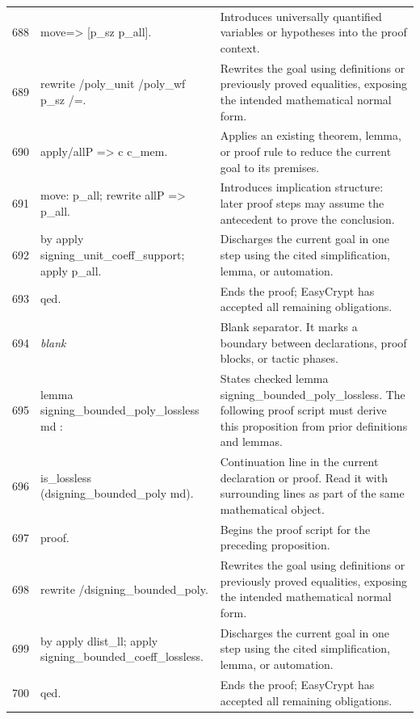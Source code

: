 \documentclass[10pt]{article}
\begin{document}
\begin{longtable}{r L{0.53\textwidth} L{0.37\textwidth}}
688 & {\ttfamily\scriptsize move=> [p\_sz p\_all].} & Introduces universally quantified variables or hypotheses into the proof context. \\
689 & {\ttfamily\scriptsize rewrite /poly\_unit /poly\_wf p\_sz /=.} & Rewrites the goal using definitions or previously proved equalities, exposing the intended mathematical normal form. \\
690 & {\ttfamily\scriptsize apply/allP => c c\_mem.} & Applies an existing theorem, lemma, or proof rule to reduce the current goal to its premises. \\
691 & {\ttfamily\scriptsize move: p\_all; rewrite allP => p\_all.} & Introduces implication structure: later proof steps may assume the antecedent to prove the conclusion. \\
692 & {\ttfamily\scriptsize by apply signing\_unit\_coeff\_support; apply p\_all.} & Discharges the current goal in one step using the cited simplification, lemma, or automation. \\
693 & {\ttfamily\scriptsize qed.} & Ends the proof; EasyCrypt has accepted all remaining obligations. \\
694 & {\ttfamily\scriptsize \emph{blank}} & Blank separator.  It marks a boundary between declarations, proof blocks, or tactic phases. \\
695 & {\ttfamily\scriptsize lemma signing\_bounded\_poly\_lossless md :} & States checked lemma signing\_bounded\_poly\_lossless.  The following proof script must derive this proposition from prior definitions and lemmas. \\
696 & {\ttfamily\scriptsize   is\_lossless (dsigning\_bounded\_poly md).} & Continuation line in the current declaration or proof.  Read it with surrounding lines as part of the same mathematical object. \\
697 & {\ttfamily\scriptsize proof.} & Begins the proof script for the preceding proposition. \\
698 & {\ttfamily\scriptsize rewrite /dsigning\_bounded\_poly.} & Rewrites the goal using definitions or previously proved equalities, exposing the intended mathematical normal form. \\
699 & {\ttfamily\scriptsize by apply dlist\_ll; apply signing\_bounded\_coeff\_lossless.} & Discharges the current goal in one step using the cited simplification, lemma, or automation. \\
700 & {\ttfamily\scriptsize qed.} & Ends the proof; EasyCrypt has accepted all remaining obligations. \\

\end{longtable}
\end{document}
